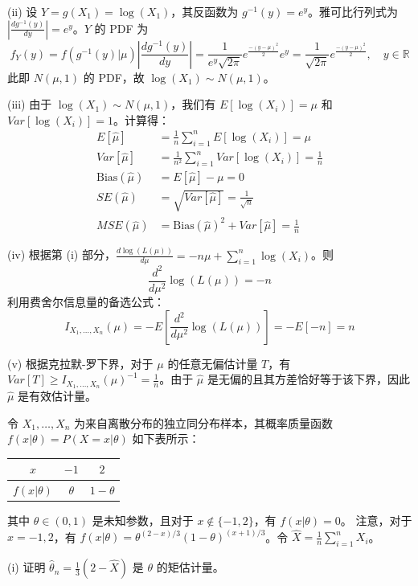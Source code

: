 \begin{questions}
\begin{solution}
(ii) 设 $Y = g(X_1) = \log(X_1)$，其反函数为 $g^{-1}(y) = e^y$。雅可比行列式为 $\left| \frac{dg^{-1}(y)}{dy} \right| = e^y$。$Y$ 的 PDF 为
\[
f_Y(y) = f(g^{-1}(y)|\mu) \left| \frac{dg^{-1}(y)}{dy} \right| = \frac{1}{e^y \sqrt{2\pi}} e^{\frac{-(y-\mu)^2}{2}} e^y = \frac{1}{\sqrt{2\pi}} e^{\frac{-(y-\mu)^2}{2}}, \quad y \in \mathbb{R}
\]
此即 $N(\mu, 1)$ 的 PDF，故 $\log(X_1) \sim N(\mu, 1)$。

(iii) 由于 $\log(X_1) \sim N(\mu, 1)$，我们有 $E[\log(X_i)] = \mu$ 和 $Var[\log(X_i)] = 1$。计算得：
\begin{align*}
E[\hat{\mu}] &= \frac{1}{n} \sum_{i=1}^n E[\log(X_i)] = \mu \\
Var[\hat{\mu}] &= \frac{1}{n^2} \sum_{i=1}^n Var[\log(X_i)] = \frac{1}{n} \\
\text{Bias}(\hat{\mu}) &= E[\hat{\mu}] - \mu = 0 \\
SE(\hat{\mu}) &= \sqrt{Var[\hat{\mu}]} = \frac{1}{\sqrt{n}} \\
MSE(\hat{\mu}) &= \text{Bias}(\hat{\mu})^2 + Var[\hat{\mu}] = \frac{1}{n}
\end{align*}

(iv) 根据第 (i) 部分，$\frac{d \log(L(\mu))}{d\mu} = -n\mu + \sum_{i=1}^n \log(X_i)$。则
\[
\frac{d^2}{d\mu^2} \log(L(\mu)) = -n
\]
利用费舍尔信息量的备选公式：
\[
I_{X_1, \ldots, X_n}(\mu) = -E\left[ \frac{d^2}{d\mu^2} \log(L(\mu)) \right] = -E[-n] = n
\]

(v) 根据克拉默-罗下界，对于 $\mu$ 的任意无偏估计量 $T$，有 $Var[T] \ge I_{X_1, \ldots, X_n}(\mu)^{-1} = \frac{1}{n}$。由于 $\hat{\mu}$ 是无偏的且其方差恰好等于该下界，因此 $\hat{\mu}$ 是有效估计量。
\end{solution}

\question
令 $X_1, \dots, X_n$ 为来自离散分布的独立同分布样本，其概率质量函数 $f(x|\theta) = P(X = x|\theta)$ 如下表所示：

\begin{center}
\begin{tabular}{c|c|c}
$x$ & $-1$ & $2$ \\ \hline
$f(x|\theta)$ & $\theta$ & $1 - \theta$
\end{tabular}
\end{center}

其中 $\theta \in (0, 1)$ 是未知参数，且对于 $x \notin \{-1, 2\}$，有 $f(x|\theta) = 0$。
注意，对于 $x = -1, 2$，有 $f(x|\theta) = \theta^{(2-x)/3}(1 - \theta)^{(x+1)/3}$。令 $\hat{X} = \frac{1}{n} \sum_{i=1}^n X_i$。

(i) 证明 $\hat{\theta}_n = \frac{1}{3}(2 - \hat{X})$ 是 $\theta$ 的矩估计量。


\end{questions}
